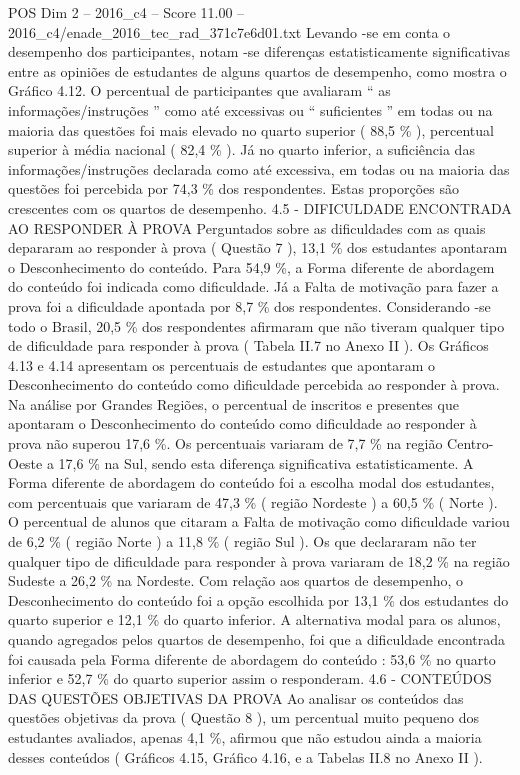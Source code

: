 \begin{textsample}{POS Dim 2 – 2016\_c4 – Score 11.00 – 2016\_c4/enade\_2016\_tec\_rad\_371c7e6d01.txt}
Levando -se em conta o desempenho dos participantes, notam -se diferenças estatisticamente significativas entre as opiniões de estudantes de alguns quartos de desempenho, como mostra o Gráfico 4.12.
O percentual de participantes que avaliaram “ as informações/instruções ” como até excessivas ou “ suficientes ” em todas ou na maioria das questões foi mais elevado no quarto superior ( 88,5 \% ), percentual superior à média nacional ( 82,4 \% ).
Já no quarto inferior, a suficiência das informações/instruções declarada como até excessiva, em todas ou na maioria das questões foi percebida por 74,3 \% dos respondentes.
Estas proporções são crescentes com os quartos de desempenho. 4.5 - DIFICULDADE ENCONTRADA AO RESPONDER À PROVA Perguntados sobre as dificuldades com as quais depararam ao responder à prova ( Questão 7 ), 13,1 \% dos estudantes apontaram o Desconhecimento do conteúdo.
Para 54,9 \%, a Forma diferente de abordagem do conteúdo foi indicada como dificuldade.
Já a Falta de motivação para fazer a prova foi a dificuldade apontada por 8,7 \% dos respondentes.
Considerando -se todo o Brasil, 20,5 \% dos respondentes afirmaram que não tiveram qualquer tipo de dificuldade para responder à prova ( Tabela II.7 no Anexo II ).
Os Gráficos 4.13 e 4.14 apresentam os percentuais de estudantes que apontaram o Desconhecimento do conteúdo como dificuldade percebida ao responder à prova.
Na análise por Grandes Regiões, o percentual de inscritos e presentes que apontaram o Desconhecimento do conteúdo como dificuldade ao responder à prova não superou 17,6 \%.
Os percentuais variaram de 7,7 \% na região Centro-Oeste a 17,6 \% na Sul, sendo esta diferença significativa estatisticamente.
A Forma diferente de abordagem do conteúdo foi a escolha modal dos estudantes, com percentuais que variaram de 47,3 \% ( região Nordeste ) a 60,5 \% ( Norte ).
O percentual de alunos que citaram a Falta de motivação como dificuldade variou de 6,2 \% ( região Norte ) a 11,8 \% ( região Sul ).
Os que declararam não ter qualquer tipo de dificuldade para responder à prova variaram de 18,2 \% na região Sudeste a 26,2 \% na Nordeste.
Com relação aos quartos de desempenho, o Desconhecimento do conteúdo foi a opção escolhida por 13,1 \% dos estudantes do quarto superior e 12,1 \% do quarto inferior.
A alternativa modal para os alunos, quando agregados pelos quartos de desempenho, foi que a dificuldade encontrada foi causada pela Forma diferente de abordagem do conteúdo : 53,6 \% no quarto inferior e 52,7 \% do quarto superior assim o responderam. 4.6 - CONTEÚDOS DAS QUESTÕES OBJETIVAS DA PROVA Ao analisar os conteúdos das questões objetivas da prova ( Questão 8 ), um percentual muito pequeno dos estudantes avaliados, apenas 4,1 \%, afirmou que não estudou ainda a maioria desses conteúdos ( Gráficos 4.15, Gráfico 4.16, e a Tabelas II.8 no Anexo II ).

\end{textsample}
